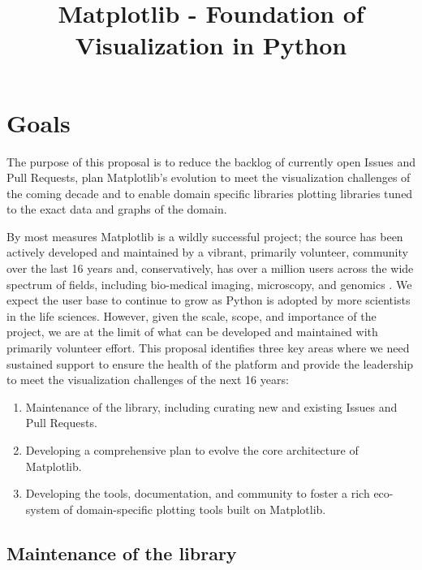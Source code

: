 \documentclass[11pt]{article}  %
\begin{document}
\title{Matplotlib - Foundation of Visualization in Python}
\author{}
\maketitle

\section{Goals}

The purpose of this proposal is to reduce the backlog of currently
open Issues and Pull Requests, plan Matplotlib's evolution to meet the
visualization challenges of the coming decade and to enable domain
specific libraries plotting libraries tuned to the exact data and
graphs of the domain.

By most measures Matplotlib is a wildly successful project; the source
has been actively developed and maintained by a vibrant, primarily
volunteer, community over the last 16 years and, conservatively, has
over a million users across the wide spectrum of fields, including
bio-medical imaging, microscopy, and genomics
\cite{Carpenter2006,Wolf2018,10.7717/peerj.453}
\cite{Segata2011,10.1371/journal.pgen.1000695,HASHIMSHONY2012666,
  10.1093/bioinformatics/bts480,Carlile2014,Laganowsky2014,Jiangaac9462,
  10.3389/fninf.2014.00014}.  We expect the user base to continue to
grow as Python is adopted by more scientists in the life sciences.
However, given the scale, scope, and importance of the project, we are
at the limit of what can be developed and maintained with primarily
volunteer effort.  This proposal identifies three key areas where we
need sustained support to ensure the health of the platform and
provide the leadership to meet the visualization challenges of the
next 16 years:

\begin{enumerate}[label=\alph*),noitemsep]
  \item Maintenance of the library, including curating new and
    existing Issues and Pull Requests.
  \item Developing a comprehensive plan to evolve the core architecture
    of Matplotlib.
  \item Developing the tools, documentation, and community to foster a
    rich eco-system of domain-specific plotting tools built on
    Matplotlib.
\end{enumerate}


\subsection{Maintenance of the library}
\end{document}
